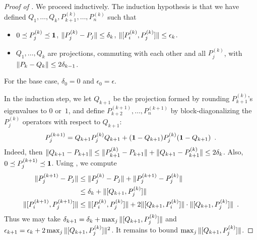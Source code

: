 \documentclass[preprintnumbers,11pt,onecolumn]{article}
\begin{document}
\begin{proof}[Proof of ]
We proceed inductively.  The induction hypothesis is that we have defined $Q_1, \ldots, Q_k, P_{k+1}^{(k)}, \ldots, P_{n}^{(k)}$ such that 
\begin{itemize}
\item $0 \preceq P_j^{(k)} \preceq \boldsymbol{1}$, ${\| P_j^{(k)} - P_j \|} \leq \delta_k$, ${\| [P_i^{(k)}, P_j^{(k)}] \|} \leq \epsilon_k$.  
\item $Q_1, \ldots, Q_k$ are projections, commuting with each other and all $P_j^{(k)}$, with ${\| P_k - Q_k \|} \leq 2 \delta_{k-1}$.  
\end{itemize}
For the base case, $\delta_0 = 0$ and $\epsilon_0 = \epsilon$.  

In the induction step, we let $Q_{k+1}$ be the projection formed by rounding $P_{k+1}^{(k)}$'s eigenvalues to $0$ or~$1$, and define $P_{k+2}^{(k+1)}, \ldots, P_n^{(k+1)}$ by block-diagonalizing the $P_j^{(k)}$ operators with respect to $Q_{k+1}$: 
\begin{equation*}
P_j^{(k+1)} = Q_{k+1} P_j^{(k)} Q_{k+1} + (\boldsymbol{1}-Q_{k+1}) P_j^{(k)} (\boldsymbol{1}-Q_{k+1})
 \enspace .
\end{equation*}
Indeed, then ${\| Q_{k+1} - P_{k+1} \|} \leq {\| P_{k+1}^{(k)} - P_{k+1} \|} + {\| Q_{k+1} - P_{k+1}^{(k)} \|} \leq 2 \delta_k$.  Also, $0 \preceq P_j^{(k+1)} \preceq \boldsymbol{1}$.  Using , we compute 
\begin{align*}
{\| P_j^{(k+1)} - P_j \|}
&\leq {\| P_j^{(k)} - P_j \|} + {\| P_j^{(k+1)} - P_j^{(k)} \|} \\
&\leq \delta_k + {\| [Q_{k+1}, P_j^{(k)}] \|} \\
{\| [P_i^{(k+1)}, P_j^{(k+1)}] \|}
&\leq {\| [P_i^{(k)}, P_j^{(k)}] \|} + 2 {\| [Q_{k+1}, P_i^{(k)}] \|} \cdot {\| [Q_{k+1}, P_j^{(k)}] \|}
 \enspace .
\end{align*}
Thus we may take $\delta_{k+1} = \delta_k + \max_j {\| [Q_{k+1}, P_j^{(k)}] \|}$ and $\epsilon_{k+1} = \epsilon_k + 2 \max_j {\| [Q_{k+1}, P_j^{(k)}] \|}{}^2$.  It remains to bound $\max_j {\| [Q_{k+1}, P_j^{(k)}] \|}$.  


\end{proof}
\end{document}
